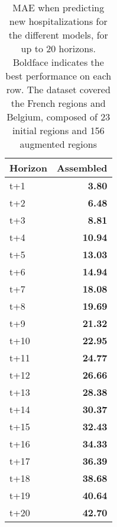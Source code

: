 \begin{table}[H]
\centering
\caption{MAE when predicting new hospitalizations for the different models, for up to 20 horizons. Boldface indicates the best performance on each row. The dataset covered the French regions and Belgium, composed of 23 initial regions and 156 augmented regions }
\label{tab:MAE_comparison}
\begin{tabular}{lr}
\toprule
Horizon &  Assembled \\
\midrule
t+1  & \textbf{3.80}  \\
t+2  & \textbf{6.48}  \\
t+3  & \textbf{8.81}  \\
t+4  & \textbf{10.94}  \\
t+5  & \textbf{13.03}  \\
t+6  & \textbf{14.94}  \\
t+7  & \textbf{18.08}  \\
t+8  & \textbf{19.69}  \\
t+9  & \textbf{21.32}  \\
t+10  & \textbf{22.95}  \\
t+11  & \textbf{24.77}  \\
t+12  & \textbf{26.66}  \\
t+13  & \textbf{28.38}  \\
t+14  & \textbf{30.37}  \\
t+15  & \textbf{32.43}  \\
t+16  & \textbf{34.33}  \\
t+17  & \textbf{36.39}  \\
t+18  & \textbf{38.68}  \\
t+19  & \textbf{40.64}  \\
t+20  & \textbf{42.70}  \\

\bottomrule
\end{tabular}
\end{table}
